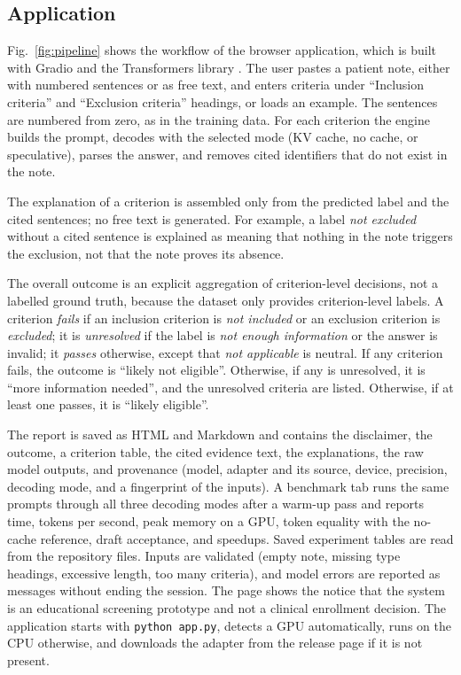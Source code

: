\documentclass[conference]{IEEEtran}
\begin{document}
\subsection{Application}\label{sec:app}
Fig.~\ref{fig:pipeline} shows the workflow of the browser application, which is built with Gradio \cite{gradio} and the Transformers library \cite{transformers}. The user pastes a patient note, either with numbered sentences or as free text, and enters criteria under ``Inclusion criteria'' and ``Exclusion criteria'' headings, or loads an example. The sentences are numbered from zero, as in the training data. For each criterion the engine builds the prompt, decodes with the selected mode (KV cache, no cache, or speculative), parses the answer, and removes cited identifiers that do not exist in the note.

The explanation of a criterion is assembled only from the predicted label and the cited sentences; no free text is generated. For example, a label \emph{not excluded} without a cited sentence is explained as meaning that nothing in the note triggers the exclusion, not that the note proves its absence.

The overall outcome is an explicit aggregation of criterion-level decisions, not a labelled ground truth, because the dataset only provides criterion-level labels. A criterion \emph{fails} if an inclusion criterion is \emph{not included} or an exclusion criterion is \emph{excluded}; it is \emph{unresolved} if the label is \emph{not enough information} or the answer is invalid; it \emph{passes} otherwise, except that \emph{not applicable} is neutral. If any criterion fails, the outcome is ``likely not eligible''. Otherwise, if any is unresolved, it is ``more information needed'', and the unresolved criteria are listed. Otherwise, if at least one passes, it is ``likely eligible''.

The report is saved as HTML and Markdown and contains the disclaimer, the outcome, a criterion table, the cited evidence text, the explanations, the raw model outputs, and provenance (model, adapter and its source, device, precision, decoding mode, and a fingerprint of the inputs). A benchmark tab runs the same prompts through all three decoding modes after a warm-up pass and reports time, tokens per second, peak memory on a GPU, token equality with the no-cache reference, draft acceptance, and speedups. Saved experiment tables are read from the repository files. Inputs are validated (empty note, missing type headings, excessive length, too many criteria), and model errors are reported as messages without ending the session. The page shows the notice that the system is an educational screening prototype and not a clinical enrollment decision. The application starts with \texttt{python app.py}, detects a GPU automatically, runs on the CPU otherwise, and downloads the adapter from the release page if it is not present.
\end{document}
